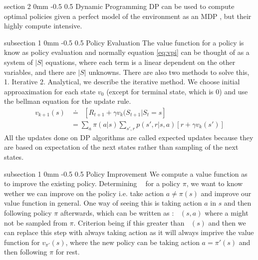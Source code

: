 \documentclass[twocolumn,11pt]{article}
\makeatletter
\DeclareMathOperator{\E}{\mathbb{E}}
\DeclareMathOperator{\qp}{q_\pi} %
\DeclareMathOperator{\vp}{v_\pi} %
\DeclareMathOperator{\Ep}{\E_\pi}
\renewcommand{\section}{\@startsection
{section}%
{2}%
{0mm}%
{-0.5\baselineskip}%
{0.5\baselineskip}%
{\bfseries\color{blue}}} %
\renewcommand{\subsection}{\@startsection
{subsection}%
{1}%
{0mm}%
{-0.5\baselineskip}%
{0.5\baselineskip}%
{\bfseries\color{blue}}} %
\makeatother
\begin{document}
\section{Dynamic Programming} DP can be used to compute optimal policies given a perfect model of the environment as an MDP , but their highly compute intensive.

\subsection{Policy Evaluation}
The value function for a policy is know as policy evaluation and normally equation \ref{eq:vpi} can be thought of as a system of $|S|$ equations, where each term is a linear dependent on the other variables, and there are $|S|$ unknowns. There are also two methods to solve this, 1. Iterative 2. Analytical, we describe the iterative method. We choose initial approaximation for each state $v_0$ (except for terminal state, which is 0) and use the bellman equation for the update rule.
\begin{align}
	v_{k+1}(s) &\doteq \Ep[R_{t+1} + \gamma v_k(S_{t+1} | S_t = s]\\
	&= \sum_a \pi(a|s) \sum_{s',r} p(s',r|s,a) [r + \gamma v_k(s')]
\end{align}
All the updates done on DP algorithms are called expected updates because they are based on expectation of the next states rather than sampling of the next states.


\subsection{Policy Improvement}
We  compute a value function as to improve the existing policy.  Determining $\vp$ for a policy $\pi$, we  want to know wether  we can improve on the policy i.e. take action $a \neq \pi(s)$ and improve our value function in general. One way of seeing this is taking action $a$ in $s$ and then following policy $\pi$ afterwards, which  can be written as : $\qp(s,a)$ where a might not be sampled from $\pi$. Criterion being if this greater than $\vp(s)$ and then we can replace this step with always taking action as it will always imprive the value function for $v_{\pi'}(s)$, where the new policy can be taking action $a = \pi'(s)$ and then following $\pi$ for rest.
\end{document}
